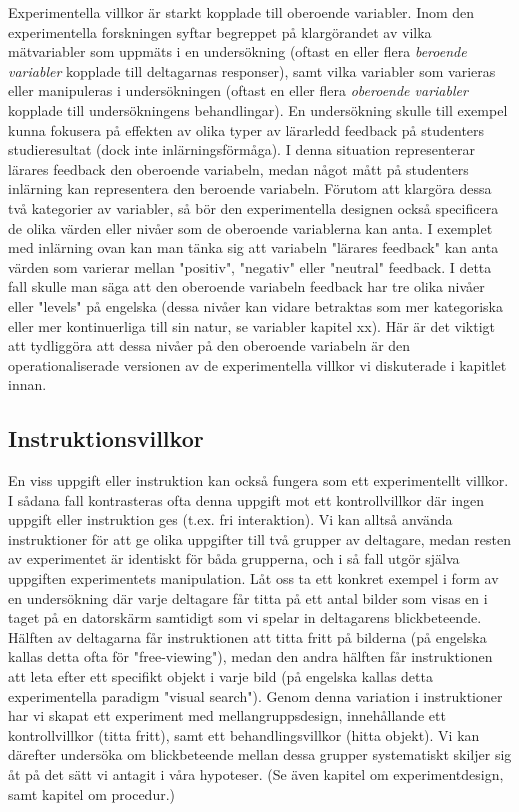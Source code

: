 \documentclass[
]{book}
\begin{document}
Experimentella villkor är starkt kopplade till oberoende variabler. Inom den experimentella forskningen syftar begreppet på klargörandet av vilka mätvariabler som uppmäts i en undersökning (oftast en eller flera \emph{beroende variabler} kopplade till deltagarnas responser), samt vilka variabler som varieras eller manipuleras i undersökningen (oftast en eller flera \emph{oberoende variabler} kopplade till undersökningens behandlingar). En undersökning skulle till exempel kunna fokusera på effekten av olika typer av lärarledd feedback på studenters studieresultat (dock inte inlärningsförmåga). I denna situation representerar lärares feedback den oberoende variabeln, medan något mått på studenters inlärning kan representera den beroende variabeln. Förutom att klargöra dessa två kategorier av variabler, så bör den experimentella designen också specificera de olika värden eller nivåer som de oberoende variablerna kan anta. I exemplet med inlärning ovan kan man tänka sig att variabeln "lärares feedback" kan anta värden som varierar mellan "positiv", "negativ" eller "neutral" feedback. I detta fall skulle man säga att den oberoende variabeln feedback har tre olika nivåer eller "levels" på engelska (dessa nivåer kan vidare betraktas som mer kategoriska eller mer kontinuerliga till sin natur, se variabler kapitel xx). Här är det viktigt att tydliggöra att dessa nivåer på den oberoende variabeln är den operationaliserade versionen av de experimentella villkor vi diskuterade i kapitlet innan.

\hypertarget{sub07.4.3}{%
\subsection{Instruktionsvillkor}\label{sub07.4.3}}

En viss uppgift eller instruktion kan också fungera som ett experimentellt villkor. I sådana fall kontrasteras ofta denna uppgift mot ett kontrollvillkor där ingen uppgift eller instruktion ges (t.ex. fri interaktion). Vi kan alltså använda instruktioner för att ge olika uppgifter till två grupper av deltagare, medan resten av experimentet är identiskt för båda grupperna, och i så fall utgör själva uppgiften experimentets manipulation. Låt oss ta ett konkret exempel i form av en undersökning där varje deltagare får titta på ett antal bilder som visas en i taget på en datorskärm samtidigt som vi spelar in deltagarens blickbeteende. Hälften av deltagarna får instruktionen att titta fritt på bilderna (på engelska kallas detta ofta för "free-viewing"), medan den andra hälften får instruktionen att leta efter ett specifikt objekt i varje bild (på engelska kallas detta experimentella paradigm "visual search"). Genom denna variation i instruktioner har vi skapat ett experiment med mellangruppsdesign, innehållande ett kontrollvillkor (titta fritt), samt ett behandlingsvillkor (hitta objekt). Vi kan därefter undersöka om blickbeteende mellan dessa grupper systematiskt skiljer sig åt på det sätt vi antagit i våra hypoteser. (Se även kapitel om experimentdesign, samt kapitel om procedur.)
\end{document}
